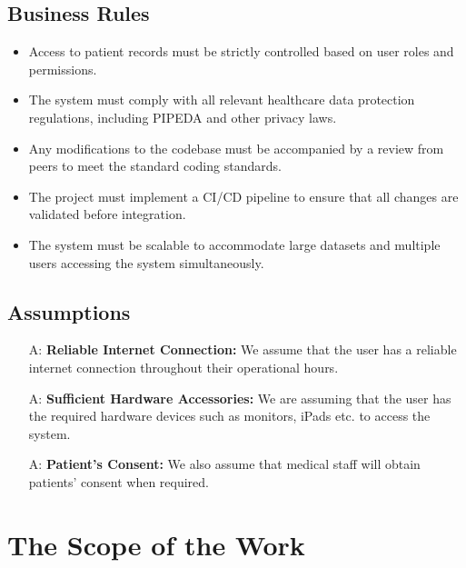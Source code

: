 \documentclass[12pt]{article}
\newcounter{assumpnum} %
\begin{document}
\subsection{Business Rules}
\begin{itemize}
  \item Access to patient records must be strictly controlled based on user roles and permissions.
  
  \item The system must comply with all relevant healthcare data protection regulations, including PIPEDA and other privacy laws.
  
  \item Any modifications to the codebase must be accompanied by a review from peers to meet the standard coding standards.
  
  \item The project must implement a CI/CD pipeline to ensure that all changes are validated before integration.

  \item The system must be scalable to accommodate large datasets and multiple users accessing the system simultaneously.
\end{itemize}

\subsection{Assumptions}

\begin{itemize}
  \item[A\refstepcounter{assumpnum}\theassumpnum \label{A_reliableInternet}:] \textbf{Reliable Internet Connection:} We assume that the user has a reliable internet connection throughout their operational hours.
  \item[A\refstepcounter{assumpnum}\theassumpnum \label{A_sufficientHardware}:] \textbf{Sufficient Hardware Accessories:} We are assuming that the user has the required hardware devices such as monitors, iPads etc. to access the system.
  \item[A\refstepcounter{assumpnum}\theassumpnum \label{A_patientConsent}:] \textbf{Patient's Consent:} We also assume that medical staff will obtain patients' consent when required.  
\end{itemize}


\section{The Scope of the Work}
\end{document}
